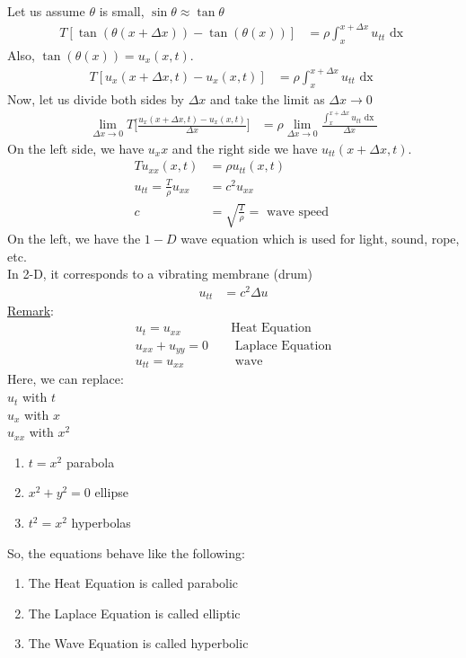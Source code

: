 \documentclass{article}
\newcommand{\dx}{\text{ dx }}
\begin{document}
Let us assume $\theta$ is small, $\sin \theta \approx \tan \theta$
\begin{align}
  T[\tan(\theta(x + \Delta x)) - \tan(\theta(x))] & = \rho \int^{x + \Delta x}_x u_{tt} \dx
\end{align}
Also, $\tan(\theta(x)) = u_x(x, t)$.
\begin{align}
  T[u_x(x + \Delta x, t) - u_x(x, t)] & =
  \rho \int^{x + \Delta x}_x u_{tt} \dx
\end{align}
Now, let us divide both sides by $\Delta x$ and take the limit as $\Delta x \rightarrow 0$
\begin{align}
  \lim_{\Delta x \rightarrow 0} T\Big[\frac{u_x(x + \Delta x, t) - u_x(x, t)}{\Delta x}\Big] & =
  \rho \lim_{\Delta x \rightarrow 0} \frac{\int^{x + \Delta x}_x u_{tt} \dx}{\Delta x}
\end{align}
On the left side, we have $u_xx$ and the right side we have $u_{tt}(x + \Delta x, t)$.
\begin{align}
  Tu_{xx}(x, t) & = \rho u_{tt}(x, t)\\
  u_{tt} = \frac{T}{\rho} u_{xx} & = c^2 u_{xx}\\
  c & = \sqrt{\frac{T}{\rho}} = \text{ wave speed }
\end{align}
On the left, we have the $1-D$ wave equation which is used for light, sound, rope, etc.\\
In 2-D, it corresponds to a vibrating membrane (drum)
\begin{align}
  u_{tt} & = c^2\Delta u
\end{align}
\underline{Remark}:
\begin{align}
  u_t = u_{xx} \quad & \text{Heat Equation}\\
  u_{xx} + u_{yy} = 0 \quad & \text{ Laplace Equation}\\
  u_{tt} = u_{xx} \quad & \text{ wave}
\end{align}
Here, we can replace:\\
$u_t$ with $t$\\
$u_x$ with $x$\\
$u_{xx}$ with $x^2$
\begin{enumerate}
  \item $t = x^2$ parabola
  \item $x^2 + y^2 = 0$ ellipse
  \item $t^2 = x^2$ hyperbolas
\end{enumerate}
So, the equations behave like the following:
\begin{enumerate}
  \item The Heat Equation is called parabolic
  \item The Laplace Equation is called elliptic
  \item The Wave Equation is called hyperbolic
\end{enumerate}
\newpage
\end{document}
